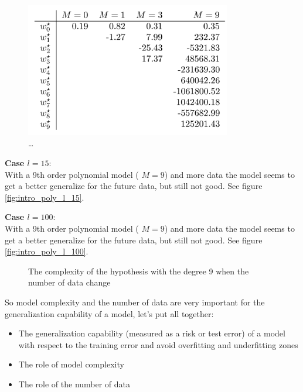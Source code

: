 \documentclass[../main.tex]{subfiles}
\begin{document}
\begin{figure}[H]
    \centering
    \includegraphics[width=0.8\textwidth]{lectures/1_Introduction/overfittingVarM.png}
    \caption{\ldots}
    \label{fig:lectures-1_Introduction-overfittingVarM-png}
\end{figure}

\noindent \textbf{Case $l = 15$}:\\
With a 9th order polynomial model ( $M = 9$) and more data the model seems to get a better generalize for the future data, but still not good. See figure \ref{fig:intro_poly_l_15}.

\noindent \textbf{Case $l = 100$}:\\
With a 9th order polynomial model ( $M = 9$) and more data the model seems to get a better generalize for the future data, but still not good. See figure \ref{fig:intro_poly_l_100}.

\begin{figure}[ht]
  \centering
  \hfill
  \caption{The complexity of the hypothesis with the degree 9 when the number of data change}
\end{figure}

\noindent So model complexity and the number of data are very important for the generalization capability of a model, let's put all together:
\begin{itemize}
    \item The generalization capability (measured as a risk or test error) of a model with respect to the training error and avoid overfitting and underfitting zones
    \item The role of model complexity
    \item The role of the number of data
\end{itemize}
\end{document}
